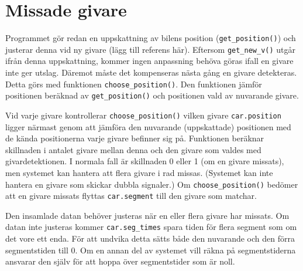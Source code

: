 \section{Missade givare}

Programmet gör redan en uppskattning av bilens position (\texttt{get\_position()})
 och justerar denna vid ny givare (lägg till referens här).
Eftersom \texttt{get\_new\_v()} utgår ifrån denna uppskattning, kommer ingen
anpassning behöva göras ifall en givare inte ger utslag. Däremot måste det 
kompenseras nästa gång en givare detekteras. Detta görs med funktionen
\texttt{choose\_position()}. Den funktionen jämför positionen beräknad av 
\texttt{get\_position()} och positionen vald av nuvarande givare. 

Vid varje givare kontrollerar \texttt{choose\_position()} vilken givare
\texttt{car.position} ligger närmast genom att jämföra den nuvarande
(uppskattade) positionen med de kända positionerna varje givare befinner sig på.
Funktionen beräknar skillnaden i antalet givare mellan denna och den givare som
valdes med givardetektionen. I normala fall är skillnaden 0 eller 1 (om en
givare missats), men systemet kan hantera att flera givare i rad missas.
(Systemet kan inte hantera en givare som skickar dubbla signaler.) Om
\texttt{choose\_position()} bedömer att en givare missats flyttas
\texttt{car.segment} till den givare som matchar.

Den insamlade datan behöver justeras när en eller flera givare har missats. Om
datan inte justeras kommer \texttt{car.seg\_times} spara tiden för flera segment
som om det vore ett enda. För att undvika detta sätts både den nuvarande och den
förra segmentstiden till 0. Om en annan del av systemet vill räkna på
segmentstiderna ansvarar den själv för att hoppa över segmentstider som är noll.
